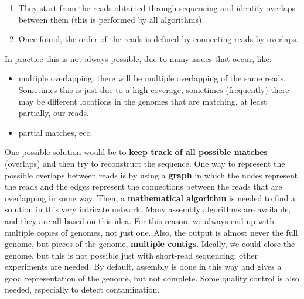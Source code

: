 \begin{enumerate}
    \item They start from the reads obtained through sequencing and identify overlaps between them (this is performed by all algorithms).
    \item Once found, the order of the reads is defined by connecting reads by overlaps.
\end{enumerate}

In practice this is not always possible, due to many issues that occur, like:

\begin{itemize}
    \item multiple overlapping: there will be multiple overlapping of the same reads. Sometimes this is just due to a high coverage, sometimes (frequently) there may be different locations in the genomes that are matching, at least partially, our reads.
    \item partial matches, ecc.
\end{itemize}

One possible solution would be to \textbf{keep track of all possible matches} (overlaps) and then try to reconstruct the sequence. One way to represent the possible overlaps between reads is by using a \textbf{graph} in which the nodes represent the reads and the edges represent the connections between the reads that are overlapping in some way. 
Then, a \textbf{mathematical algorithm} is needed to find a solution in this very intricate network. 
Many assembly algorithms are available, and they are all based on this idea. For this reason, we always end up with multiple copies of genomes, not just one. 
Also, the output is almost never the full genome, but pieces of the genome, \textbf{multiple contigs}. Ideally, we could close the genome, but this is not possible just with short-read sequencing; other experiments are needed. By default, assembly is done in this way and gives a good representation of the genome, but not complete. Some quality control is also needed, especially to detect contamination.

